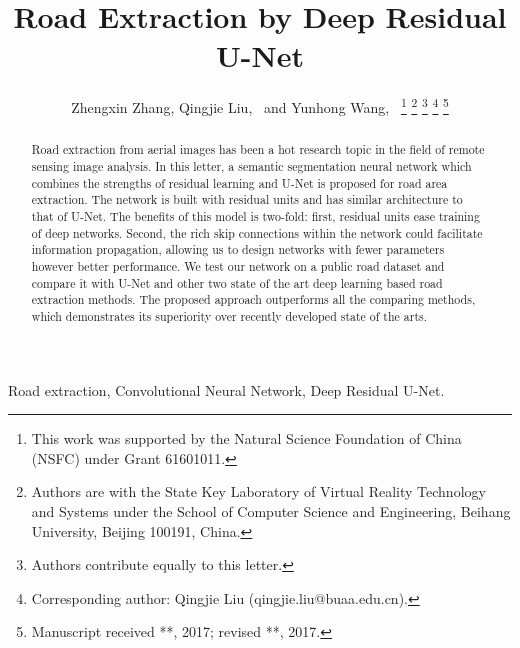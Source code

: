 \documentclass[journal]{IEEEtran}
\begin{document}
\title{Road Extraction by Deep Residual U-Net}


\author{Zhengxin Zhang, Qingjie Liu,~
	and Yunhong Wang,~
\thanks{This work was supported by the Natural Science Foundation of China (NSFC) under Grant 61601011.}
\thanks{Authors are with the State Key Laboratory of Virtual Reality Technology and Systems under the School of Computer Science and Engineering, Beihang University, Beijing 100191, China.}
\thanks{ Authors contribute equally to this letter. }
\thanks{ Corresponding author: Qingjie Liu (qingjie.liu@buaa.edu.cn).}
\thanks{Manuscript received **, 2017; revised **, 2017.}
}




















\maketitle

\begin{abstract}
Road extraction from aerial images has been a hot research topic in the field of remote sensing image analysis. In this letter, a semantic segmentation neural network which combines the strengths of residual learning and U-Net is proposed for road area extraction. The network is built with residual units and has similar architecture to that of U-Net. The benefits of this model is two-fold: first, residual units ease  training of deep networks. Second, the rich skip connections within the network could facilitate information propagation, allowing us to design networks with fewer parameters however better performance. We test our network on a public road dataset and compare it with U-Net and other two state of the art deep learning based road extraction methods. The proposed approach outperforms all the comparing methods, which demonstrates its superiority over recently developed state of the arts. 
\end{abstract}

\begin{IEEEkeywords}
Road extraction, Convolutional Neural Network, Deep Residual U-Net.
\end{IEEEkeywords}
\end{document}
